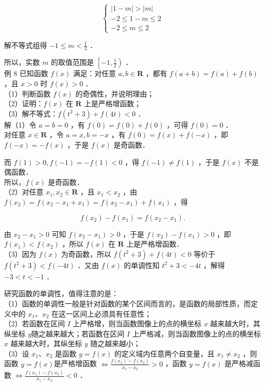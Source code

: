 \documentclass[10pt]{article}
\begin{document}
\[
\left\{\begin{array}{l}
|1-m|>|m| \\
-2 \leqslant 1-m \leqslant 2 \\
-2 \leqslant m \leqslant 2
\end{array}\right.
\]

解不等式组得 \(-1 \leqslant m<\frac{1}{2}\) ．

所以，实数 \(m\) 的取值范围是 \(\left[-1, \frac{1}{2}\right)\) ．\\
例 8 已知函数 \(f(x)\) 满足：对任意 \(a, b \in \mathbf{R}\) ，都有 \(f(a+b)=f(a)+f(b)\) ，且 \(x>0\) 时 \(f(x)>0\) ．\\
（1）判断函数 \(f(x)\) 的奇偶性，并说明理由；\\
（2）证明：\(f(x)\) 在 \(\mathbf{R}\) 上是严格增函数；\\
（3）解不等式：\(f\left(t^{2}+3\right)+f(4 t)<0\) ．\\
解（1）令 \(a=b=0\) ，有 \(f(0)=f(0)+f(0)\) ，可得 \(f(0)=0\) ．\\
对任意 \(x \in \mathbf{R}\) ，令 \(a=x, b=-x\) ，有 \(f(0)=f(x)+f(-x)\) ，即 \(f(-x)=-f(x)\) ，于是 \(f(x)\) 是奇函数．

而 \(f(1)>0, f(-1)=-f(1)<0\) ，得 \(f(-1) \neq f(1)\) ，于是 \(f(x)\) 不是偶函数．\\
所以，\(f(x)\) 是奇函数．\\
（2）对任意 \(x_{1}, x_{2} \in \mathbf{R}\) ，且 \(x_{1}<x_{2}\) ，由 \(f\left(x_{2}\right)=f\left(x_{2}-x_{1}+x_{1}\right)=f\left(x_{2}-x_{1}\right)+f\left(x_{1}\right)\) ，得

\[
f\left(x_{2}\right)-f\left(x_{1}\right)=f\left(x_{2}-x_{1}\right) .
\]

由 \(x_{2}-x_{1}>0\) 可知 \(f\left(x_{2}-x_{1}\right)>0\) ，于是 \(f\left(x_{2}\right)-f\left(x_{1}\right)>0\) ，即 \(f\left(x_{1}\right)<f\left(x_{2}\right)\) ，所以 \(f(x)\) 在 \(\mathbf{R}\) 上是严格增函数．\\
（3）因为 \(f(x)\) 为奇函数，所以 \(f\left(t^{2}+3\right)+f(4 t)<0\) 等价于 \(f\left(t^{2}+3\right)<f(-4 t)\) ．又由 \(f(x)\) 的单调性知 \(t^{2}+3<-4 t\) ，解得 \(-3<t<-1\) ．

研究函数的单调性，值得注意的是：\\
（1）函数的单调性一般是针对函数的某个区间而言的，是函数的局部性质，而定义中的 \(x_{1} 、 x_{2}\) 在这一区间上必须具有任意性；\\
（2）若函数在区间 \(I\) 上严格增，则当函数图像上的点的横坐标 \(x\) 越来越大时，其纵坐标 \(y\)随之越来越大；若函数在区间 \(I\) 上严格减，则当函数图像上的点的横坐标 \(x\) 越来越大时，其纵坐标 \(y\) 随之越来越小；\\
（3）设 \(x_{1} 、 x_{2}\) 是函数 \(y=f(x)\) 的定义域内任意两个自变量，且 \(x_{1} \neq x_{2}\) ，则函数 \(y=f(x)\)是严格增函数 \(\Leftrightarrow \frac{f\left(x_{1}\right)-f\left(x_{2}\right)}{x_{1}-x_{2}}>0\) ，函数 \(y=f(x)\) 是严格减函数 \(\Leftrightarrow \frac{f\left(x_{1}\right)-f\left(x_{2}\right)}{x_{1}-x_{2}}<0\) ．
\end{document}
